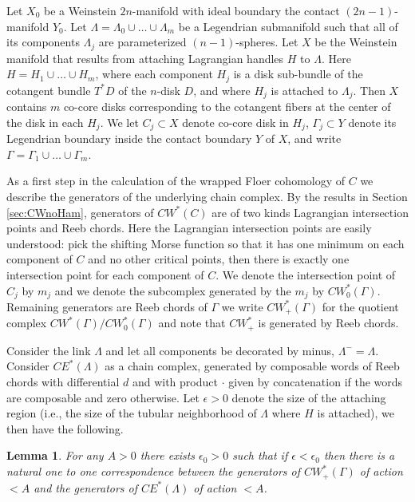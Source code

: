 \documentclass{gtpart}
\newtheorem{lem}[thm]{Lemma}
\begin{document}
Let $X_0$ be a Weinstein $2n$-manifold with ideal boundary the contact $(2n-1)$-manifold $Y_0$. Let $\Lambda=\Lambda_0\cup\dots\cup\Lambda_m$ be a Legendrian submanifold such that all of its components $\Lambda_j$ are parameterized $(n-1)$-spheres. Let $X$ be the Weinstein manifold that results from attaching Lagrangian handles $H$ to $\Lambda$. Here $H=H_{1}\cup\dots\cup H_{m}$, where each component $H_j$ is a disk sub-bundle of the cotangent bundle $T^{\ast}D$ of the $n$-disk $D$, and where $H_j$ is attached to $\Lambda_j$. Then $X$ contains $m$ co-core disks corresponding to the cotangent fibers at the center of the disk in each $H_j$. We let $C_j\subset X$ denote co-core disk in $H_j$, $\Gamma_j\subset Y$ denote its Legendrian boundary inside the contact boundary $Y$ of $X$, and write $\Gamma=\Gamma_1\cup\dots\cup\Gamma_m$. 

As a first step in the calculation of the wrapped Floer cohomology of $C$ we describe the generators of the underlying chain complex. By the results in Section \ref{sec:CWnoHam}, generators of $CW^{\ast}(C)$ are of two kinds Lagrangian intersection points and Reeb chords. Here the Lagrangian intersection points are easily understood: pick the shifting Morse function so that it has one minimum on each component of $C$ and no other critical points, then there is exactly one intersection point for each component of $C$. We denote the intersection point of $C_{j}$ by $m_{j}$ and we denote the subcomplex generated by the $m_{j}$ by $CW^{\ast}_{0}(\Gamma)$. Remaining generators are Reeb chords of $\Gamma$ we write $CW^{\ast}_{+}(\Gamma)$ for the quotient complex $CW^{\ast}(\Gamma)/CW^{\ast}_{0}(\Gamma)$ and note that $CW^{\ast}_{+}$ is generated by Reeb chords.
 
Consider the link $\Lambda$ and let all components be decorated by minus, $\Lambda^{-}=\Lambda$.
Consider $CE^{\ast}(\Lambda)$ as a chain complex, generated by composable words
of Reeb chords with differential $d$ and with product $\cdot$ given by concatenation if the words are composable and zero otherwise. Let $\epsilon>0$ denote the size of the attaching region (i.e., the size of the tubular neighborhood of $\Lambda$ where $H$ is attached), we then have the following.

\begin{lem}\label{l:BEEchords=words}
For any $A>0$ there exists $\epsilon_0>0$ such that if $\epsilon<\epsilon_0$ then there is a natural
    one to one correspondence between the generators of $CW_{+}^{\ast}(\Gamma)$ of action $<A$ and
    the generators of $CE^{\ast}(\Lambda)$ of action $<A$. 
\end{lem}
\end{document}
